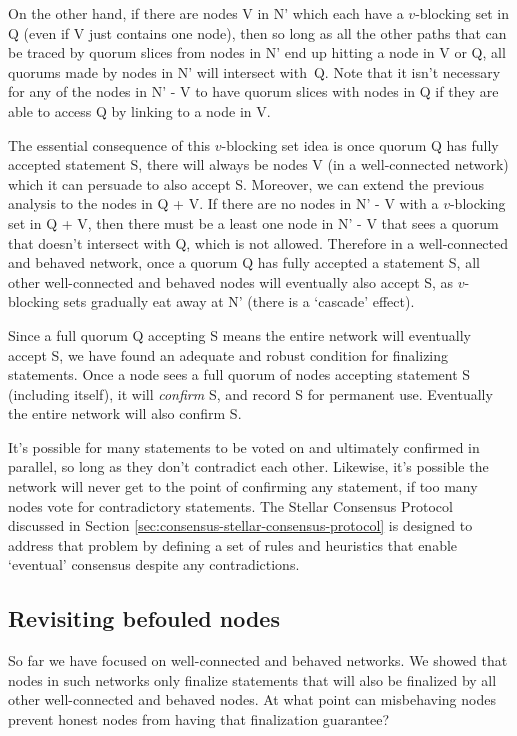 On the other hand, if there are nodes V in N' which each have a $v$-blocking set in Q (even if V just contains one node), then so long as all the other paths that can be traced by quorum slices from nodes in N' end up hitting a node in V or Q, all quorums made by nodes in N' will intersect with~Q. Note that it isn't necessary for any of the nodes in N' - V to have quorum slices with nodes in Q if they are able to access Q by linking to a node in V.

The essential consequence of this $v$-blocking set idea is once quorum Q has fully accepted statement S, there will always be nodes V (in a well-connected network) which it can persuade to also accept S. Moreover, we can extend the previous analysis to the nodes in Q + V. If there are no nodes in N' - V with a $v$-blocking set in Q + V, then there must be a least one node in N' - V that sees a quorum that doesn't intersect with Q, which is not allowed. Therefore in a well-connected and behaved network, once a quorum Q has fully accepted a statement S, all other well-connected and behaved nodes will eventually also accept S, as $v$-blocking sets gradually eat away at N' (there is a `cascade' effect).

Since a full quorum Q accepting S means the entire network will eventually accept S, we have found an adequate and robust condition for finalizing statements. Once a node sees a full quorum of nodes accepting statement S (including itself), it will {\em confirm} S, and record S for permanent use. Eventually the entire network will also confirm S.

It's possible for many statements to be voted on and ultimately confirmed in parallel, so long as they don't contradict each other. Likewise, it's possible the network will never get to the point of confirming any statement, if too many nodes vote for contradictory statements. The Stellar Consensus Protocol discussed in Section \ref{sec:consensus-stellar-consensus-protocol} is designed to address that problem by defining a set of rules and heuristics that enable `eventual' consensus despite any contradictions.


\subsection{Revisiting befouled nodes}
\label{subsec:consensus-revisiting-befouled-nodes}

So far we have focused on well-connected and behaved networks. We showed that nodes in such networks only finalize statements that will also be finalized by all other well-connected and behaved nodes. At what point can misbehaving nodes prevent honest nodes from having that finalization guarantee?

